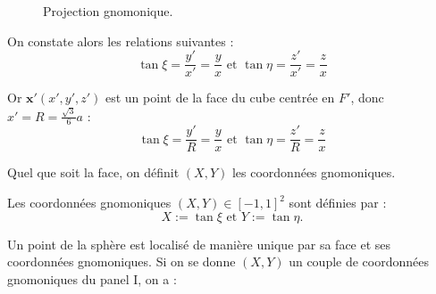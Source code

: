 \begin{figure}[htbp]
\begin{center}
\end{center}
\caption{Projection gnomonique.}
\label{fig: projection gnomonique}
\end{figure}  

On constate alors les relations suivantes :
\begin{equation}
\tan \xi = \dfrac{y'}{x'} = \dfrac{y}{x} \text{ et } \tan \eta = \dfrac{z'}{x'} = \dfrac{z}{x}
\end{equation}

Or $\mathbf{x}'(x',y',z')$ est un point de la face du cube centrée en $F'$, donc $x'=R=\frac{\sqrt{3}}{6}a$ :
\begin{equation}
\tan \xi = \dfrac{y'}{R} = \dfrac{y}{x} \text{ et } \tan \eta = \dfrac{z'}{R} = \dfrac{z}{x}
\end{equation}

Quel que soit la face, on définit $(X,Y)$ les coordonnées gnomoniques.

\begin{definition}
Les coordonnées gnomoniques $(X,Y) \in [-1,1]^2$ sont définies par :
\begin{equation}
X:=\tan \xi \text{ et } Y:= \tan \eta.
\end{equation}
\end{definition}

Un point de la sphère est localisé de manière unique par sa face et ses coordonnées gnomoniques. Si on se donne $(X,Y)$ un couple de coordonnées gnomoniques du panel I, on a :

